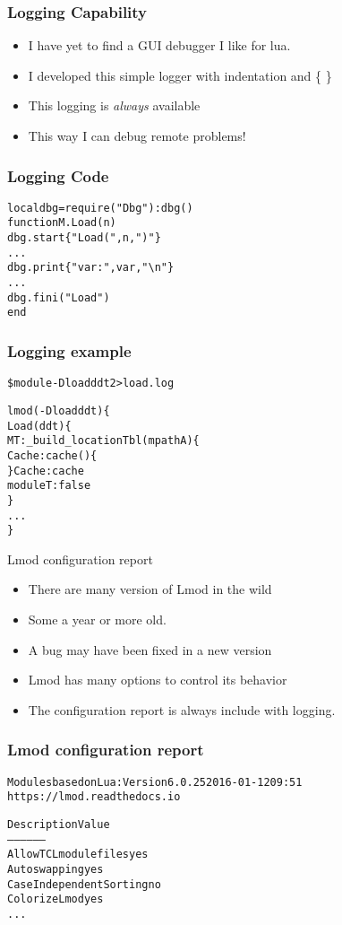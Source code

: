 \documentclass{beamer}
\begin{document}
\begin{frame}[fragile]
    \frametitle{Logging Capability}
  \begin{itemize}
    \item I have yet to find a GUI debugger I like for lua.
    \item I developed this simple logger with indentation and \{ \}
    \item This logging is \emph{\color{blue} always} available
    \item This way I can debug remote problems!
 \end{itemize}
\end{frame}    

\begin{frame}[fragile]
    \frametitle{Logging Code}
    {\small
      \begin{alltt}
local dbg = require("Dbg"):dbg()
function M.Load(n)
    dbg.start\{"Load(",n,")"\}
    ...
    dbg.print\{"var: ",var,"\textbackslash{}n"\}
    ...
    dbg.fini("Load")
end

      \end{alltt}
    }
\end{frame}    

\begin{frame}[fragile]
    \frametitle{Logging example}
    {\small
      \begin{alltt}
\$ module -D load ddt 2> load.log

lmod(-D load ddt)\{
  Load(ddt)\{
    MT:_build_locationTbl(mpathA)\{
      Cache:cache()\{
      \} Cache:cache
      moduleT: false
    \}
      ...
\}
      \end{alltt}
    }
\end{frame}    

\begin{frame}{Lmod configuration report}
  \begin{itemize}
    \item There are many version of Lmod in the wild
    \item Some a year or more old.
    \item A bug may have been fixed in a new version
    \item Lmod has many options to control its behavior
    \item The configuration report is always include with logging.
  \end{itemize}
\end{frame}

\begin{frame}[fragile]
    \frametitle{Lmod configuration report}
    {\small
      \begin{alltt}
Modules based on Lua: Version 6.0.25 2016-01-12 09:51
    https://lmod.readthedocs.io

Description                      Value
-----------                      -----
Allow TCL modulefiles            yes
Auto swapping                    yes
Case Independent Sorting         no
Colorize Lmod                    yes
...
      \end{alltt}
    }
\end{frame}    
\end{document}
